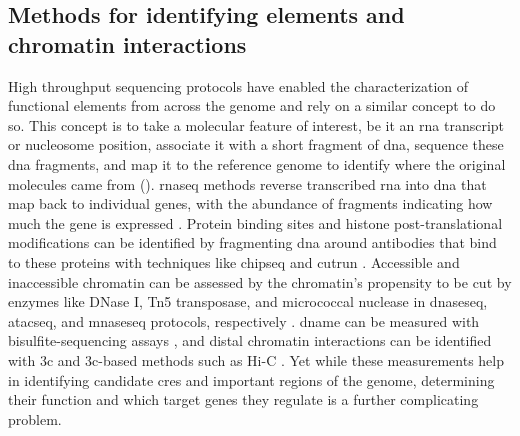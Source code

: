 \subsection{Methods for identifying  elements and chromatin interactions}

High throughput sequencing protocols have enabled the characterization of functional elements from across the genome and rely on a similar concept to do so.
This concept is to take a molecular feature of interest, be it an \gls{rna} transcript or nucleosome position, associate it with a short fragment of \gls{dna}, sequence these \gls{dna} fragments, and map it to the reference genome to identify where the original molecules came from ().
\Gls{rnaseq} methods reverse transcribed \gls{rna} into \gls{dna} that map back to individual genes, with the abundance of fragments indicating how much the gene is expressed \cite{conesaSurveyBestPractices2016}.
Protein binding sites and histone post-translational modifications can be identified by fragmenting \gls{dna} around antibodies that bind to these proteins with techniques like \gls{chipseq} and \gls{cutrun} \cite{robertsonGenomewideProfilesSTAT12007,baileyPracticalGuidelinesComprehensive2013,skeneTargetedSituGenomewide2018}.
Accessible and inaccessible chromatin can be assessed by the chromatin's propensity to be cut by enzymes like DNase I, Tn5 transposase, and micrococcal nuclease in \gls{dnaseseq}, \gls{atacseq}, and \gls{mnaseseq} protocols, respectively \cite{boyleHighResolutionMappingCharacterization2008,buenrostroTranspositionNativeChromatin2013,buenrostroATACseqMethodAssaying2015,corcesImprovedATACseqProtocol2017,schonesDynamicRegulationNucleosome2008}.
\Gls{dname} can be measured with bisulfite-sequencing assays \cite{lairdPrinciplesChallengesGenomewide2010}, and distal chromatin interactions can be identified with \gls{3c} and \gls{3c}-based methods such as Hi-C \cite{dekkerCapturingChromosomeConformation2002,liebermanaidenComprehensiveMappingLongRange2009,dixonTopologicalDomainsMammalian2012,noraSpatialPartitioningRegulatory2012,rao3DMapHuman2014}.
Yet while these measurements help in identifying candidate \glspl{cre} and important regions of the genome, determining their function and which target genes they regulate is a further complicating problem.


